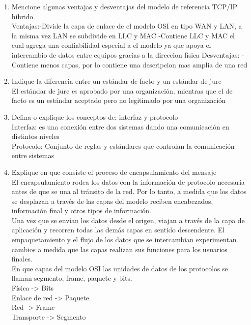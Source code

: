 \documentclass{udparticle}
\begin{document}
\begin{enumerate}
\item Mencione algunas ventajas y desventajas del modelo de referencia TCP/IP híbrido.\\
    Ventajas:-Divide la capa de enlace de el modelo OSI en tipo WAN y LAN, a la misma vez LAN se subdivide en LLC y MAC
             -Contiene LLC y MAC el cual agrega una confiabilidad especial a el modelo ya que apoya el intercambio de datos
              entre equipos gracias a la direccion física
    Desventajas: -Contiene menos capas, por lo contiene una descripcion mas amplia de una red 
\item Indique la diferencia entre un estándar de  facto y un estándar de  jure\\
    El estándar de jure es aprobado por una organización, mientras que el de facto es un estándar aceptado pero 
    no legitimado por una organización\\
\item Defina o explique los conceptos de: interfaz y protocolo\\
    Interfaz: es una conexión entre dos sistemas dando una comunicación en distintos niveles\\
    Protocolo: Conjunto de reglas y estándares que controlan la comunicación entre sistemas\\
\item Explique en que consiste el proceso de encapsulamiento del mensaje\\
    El encapsulamiento rodea los datos con la información de protocolo necesaria antes de que se una al tránsito de la red.
    Por lo tanto, a medida que los datos se desplazan a través de las capas del modelo reciben encabezados, información final y otros
    tipos de información.\\
    Una vez que se envían los datos desde el origen, viajan a través de la capa de aplicación y recorren todas las demás capas en 
    sentido descendente. El empaquetamiento y el flujo de los datos que se intercambian experimentan cambios a medida que las capas 
    realizan sus funciones para los usuarios finales.\\

\itemIndique En que capas del modelo OSI las unidades de datos de los protocolos se llaman segmento,
frame, paquete y bits.\\
  Física -> Bits\\
  Enlace de red -> Paquete\\
  Red -> Frame\\
  Transporte -> Segmento\\


\end{enumerate}
\end{document}
